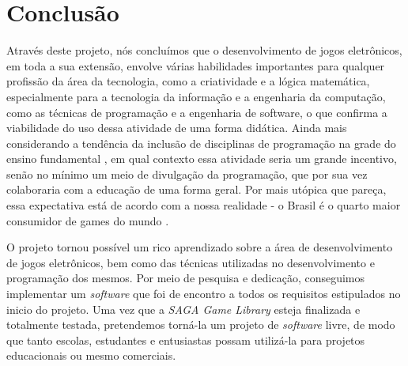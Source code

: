 \chapter{Conclusão}
\label{conclusao}
%
Através deste projeto, nós concluímos que o desenvolvimento de jogos eletrônicos, em toda a sua extensão, envolve várias habilidades importantes para qualquer profissão da área da tecnologia, como a criatividade e a lógica matemática, especialmente para a tecnologia da informação e a engenharia da computação, como as técnicas de programação e a engenharia de software, o que confirma a viabilidade do uso dessa atividade de uma forma didática.
Ainda mais considerando a tendência da inclusão de disciplinas de programação na grade do ensino fundamental \nocite{OLHARDIG}, em qual contexto essa atividade seria um grande incentivo, senão no mínimo um meio de divulgação da programação, que por sua vez colaboraria com a educação de uma forma geral. Por mais utópica que pareça, essa expectativa está de acordo com a nossa realidade - o Brasil é o quarto maior consumidor de games do mundo \nocite{ESTADAO}. 
\par 
O projeto tornou possível um rico aprendizado sobre a área de desenvolvimento de jogos eletrônicos, bem como das técnicas utilizadas no desenvolvimento e programação dos mesmos. Por meio de pesquisa e dedicação, conseguimos implementar um \textit{software} que foi de encontro a todos os requisitos estipulados no inicio do projeto. Uma vez que a \textit{SAGA Game Library} esteja finalizada e totalmente testada, pretendemos torná-la um projeto de \textit{software} livre, de modo que tanto escolas, estudantes e entusiastas possam utilizá-la para projetos educacionais ou mesmo comerciais.